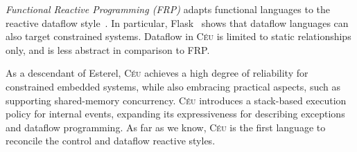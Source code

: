 \documentclass{acm_proc_article-sp}
\newcommand{\CEU}{\textsc{C\'{e}u}\xspace}
\newcommand{\1}{\;}
\newcommand{\2}{\;\;}
\newcommand{\3}{\;\;\;}
\newcommand{\5}{\;\;\;\;\;}
\begin{document}
\emph{Functional Reactive Programming (FRP)} adapts functional languages to the 
reactive dataflow style~\cite{frp.principles}.
In particular, Flask~\cite{wsn.flask} shows that dataflow languages can also 
target constrained systems.
%
Dataflow in \CEU is limited to static relationships only, and is less abstract 
in comparison to FRP.


As a descendant of Esterel, \CEU achieves a high degree of reliability for 
constrained embedded systems, while also embracing practical aspects, such as 
supporting shared-memory concurrency.
%
\CEU introduces a stack-based execution policy for internal events, expanding 
its expressiveness for describing exceptions and dataflow programming.
%
As far as we know, \CEU is the first language to reconcile the control and 
dataflow reactive styles.
%

\end{document}
